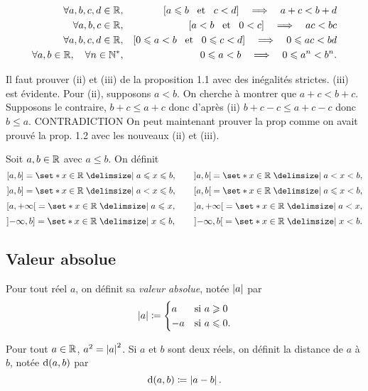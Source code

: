 \documentclass{magnolia}
\begin{document}
\begin{proposition}
\begin{eqnarray*}
\forall a,b,c,d\in\mathbb{R}, & & \left[a\leqslant b \quad\!\text{et}\quad\! c< d\right]\quad\Longrightarrow\quad
       a+c< b+d\\
\forall a,b,c\in\mathbb{R}, & & \left[a< b \quad\!\text{et}\quad\! 0< c\right]\quad\Longrightarrow\quad ac< bc\\
\forall a,b,c,d\in\mathbb{R}, & & \left[0\leqslant a< b \quad\!\text{et}\quad\! 0\leqslant c< d\right]\quad\Longrightarrow\quad
       0\leqslant ac< bd\\
\forall a,b\in\mathbb{R}, \quad \forall n\in{\mathbb{N}^*}, & & 0\leqslant a< b \quad\Longrightarrow\quad
  0\leqslant a^n< b^n.
\end{eqnarray*}
\end{proposition}

\begin{preuve}
Il faut prouver (ii) et (iii) de la proposition 1.1 avec des inégalités strictes.
(iii) est évidente.
Pour (ii), supposons $a<b$. On cherche à montrer que $a+c<b+c$. Supposons le contraire, $b+c\leq a+c$ donc d'après (ii) $b+c-c\leq a+c-c$ donc $b\leq a$. CONTRADICTION
On peut maintenant prouver la prop comme on avait prouvé la prop. 1.2 avec les nouveaux (ii) et (iii).
\end{preuve}


\begin{definition}[utile=-3]
Soit $a,b\in\mathbb{R}$ avec $a\leq b$. On définit
\[\interf{a}{b}=\enstq{x\in\R}{a\leq x\leq b}, \qquad
  \intero{a}{b}=\enstq{x\in\R}{a< x< b},\]
\[\interof{a}{b}=\enstq{x\in\R}{a< x\leq b}, \qquad
  \interfo{a}{b}=\enstq{x\in\R}{a\leq x< b},\]
\[\interfo{a}{+\infty}=\enstq{x\in\R}{a\leq x}, \qquad
  \intero{a}{+\infty}=\enstq{x\in\R}{a< x},\]
\[\interof{-\infty}{b}=\enstq{x\in\R}{x\leq b}, \qquad
  \intero{-\infty}{b}=\enstq{x\in\R}{x< b}.\]
\end{definition}

\subsection{Valeur absolue}

\begin{definition}[utile=-3]
Pour tout réel $a$, on définit sa \emph{valeur absolue}, notée $\left|a\right|$ par
  \[\left|a\right|\coloneqq
    \begin{cases}
    a  & \text{si $a\geqslant 0$}\\
    -a & \text{si $a\leqslant 0$.}
    \end{cases}\]
\end{definition}

\begin{remarques}
\remarque Pour tout $a\in\mathbb{R}$, $a^2=\left|a\right|^2$.
\remarque Si $a$ et $b$ sont deux réels, on définit la distance de $a$ à $b$,
  notée ${\rm d}\!\left(a,b\right)$ par
  \[{\rm d}\!\left(a,b\right)\coloneqq\left|a-b\right|.\]
\end{remarques}
\end{document}
